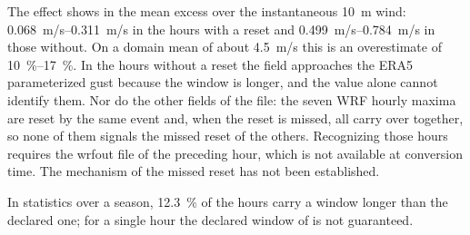 The effect shows in the mean excess over the instantaneous \SI{10}{m} wind:
\SIrange{0.068}{0.311}{m/s} in the hours with a reset and \SIrange{0.499}{0.784}{m/s} in those
without. On a domain mean of about \SI{4.5}{m/s} this is an overestimate of
\SIrange{10}{17}{\percent}. In the hours without a reset the field approaches the ERA5
parameterized gust because the window is longer, and the value alone cannot identify them. Nor do the other fields of the file: the seven WRF hourly maxima are reset by the same
event and, when the reset is missed, all carry over together, so none of them signals the missed
reset of the others. Recognizing those hours requires the wrfout file of the preceding hour, which
is not available at conversion time. The mechanism of the missed reset has not been established.

In statistics over a season, \SI{12.3}{\percent} of the hours carry a window longer than the
declared one; for a single hour the declared window of  is not guaranteed.
